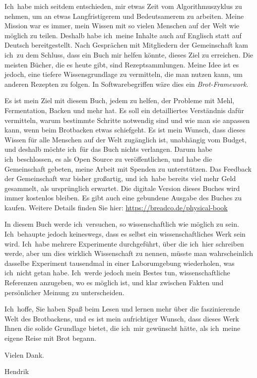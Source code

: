 Ich~habe mich seitdem entschieden, mir etwas Zeit vom Algorithmuszyklus zu
nehmen, um an etwas Langfristigerem und Bedeutsamerem zu arbeiten. Meine
Mission war es immer, mein Wissen mit so vielen Menschen auf der Welt wie
möglich zu teilen. Deshalb habe ich~meine Inhalte auch auf Englisch statt auf
Deutsch bereitgestellt. Nach Gesprächen mit Mitgliedern der Gemeinschaft kam
ich~zu dem Schluss, dass ein Buch mir helfen könnte, dieses Ziel zu erreichen.
Die meisten Bücher, die es heute gibt, sind Rezeptsammlungen. Meine Idee
ist es jedoch, eine tiefere Wissensgrundlage zu vermitteln, die man nutzen
kann, um anderen Rezepten zu folgen. In Softwarebegriffen wäre dies ein
\emph{Brot-Framework}.

Es ist mein Ziel mit diesem Buch, jedem zu helfen, der Probleme mit Mehl,
Fermentation, Backen und mehr hat. Es soll ein detailliertes Verständnis
dafür vermitteln, warum bestimmte Schritte notwendig sind und wie man sie
anpassen kann, wenn beim Brotbacken etwas schiefgeht.
Es ist mein Wunsch, dass dieses Wissen für alle Menschen auf der Welt
zugänglich ist, unabhängig vom Budget, und deshalb möchte ich~für das Buch
nichts verlangen. Darum habe ich~beschlossen, es als Open Source zu
veröffentlichen, und habe die Gemeinschaft gebeten, meine Arbeit mit Spenden
zu unterstützen. Das Feedback der Gemeinschaft war bisher großartig, und
ich~habe bereits viel mehr Geld gesammelt, als ursprünglich erwartet. Die
digitale Version dieses Buches wird immer kostenlos bleiben. Es gibt auch eine
gebundene Ausgabe des Buches zu kaufen. Weitere Details finden Sie hier:
\url{https://breadco.de/physical-book}

In diesem Buch werde ich~versuchen, so wissenschaftlich wie möglich zu sein.
Ich~behaupte jedoch keineswegs, dass es selbst ein wissenschaftliches Werk
sein wird. Ich~habe mehrere Experimente durchgeführt, über die ich~hier
schreiben werde, aber um dies wirklich Wissenschaft zu nennen, müsste man
wahrscheinlich dasselbe Experiment tausendmal in einer Laborumgebung
wiederholen, was ich~nicht getan habe. Ich~werde jedoch mein Bestes tun,
wissenschaftliche Referenzen anzugeben, wo es möglich ist, und klar zwischen
Fakten und persönlicher Meinung zu unterscheiden.

Ich~hoffe, Sie haben Spaß beim Lesen und lernen mehr über die faszinierende
Welt des Brotbackens, und es ist mein aufrichtiger Wunsch, dass dieses Werk
Ihnen die solide Grundlage bietet, die ich~mir gewünscht hätte, als ich~meine
eigene Reise mit Brot begann.

Vielen Dank.

Hendrik
